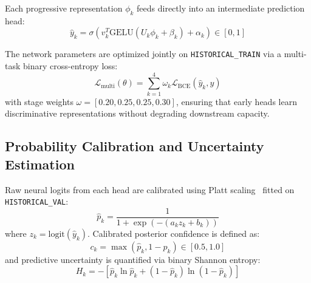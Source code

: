 \documentclass[journal]{IEEEtran}
\begin{document}
Each progressive representation $\phi_k$ feeds directly into an intermediate prediction head:
\begin{equation}
\hat{y}_k = \sigma\left(v_k^T \mathrm{GELU}(U_k \phi_k + \beta_k) + \alpha_k\right) \in [0, 1]
\end{equation}

The network parameters are optimized jointly on \texttt{HISTORICAL\_TRAIN} via a multi-task binary cross-entropy loss:
\begin{equation}
\mathcal{L}_{\mathrm{multi}}(\theta) = \sum_{k=1}^{4} \omega_k \mathcal{L}_{\mathrm{BCE}}(\hat{y}_k, y)
\end{equation}
with stage weights $\omega = [0.20, 0.25, 0.25, 0.30]$, ensuring that early heads learn discriminative representations without degrading downstream capacity.

\subsection{Probability Calibration and Uncertainty Estimation}
Raw neural logits from each head are calibrated using Platt scaling~\cite{platt1999probabilistic} fitted on \texttt{HISTORICAL\_VAL}:
\begin{equation}
\hat{p}_k = \frac{1}{1 + \exp(-(a_k z_k + b_k))}
\end{equation}
where $z_k = \mathrm{logit}(\hat{y}_k)$. Calibrated posterior confidence is defined as:
\begin{equation}
c_k = \max(\hat{p}_k, 1 - \hat{p}_k) \in [0.5, 1.0]
\end{equation}
and predictive uncertainty is quantified via binary Shannon entropy:
\begin{equation}
H_k = -\left[\hat{p}_k \ln \hat{p}_k + (1 - \hat{p}_k) \ln(1 - \hat{p}_k)\right]
\end{equation}
\end{document}
